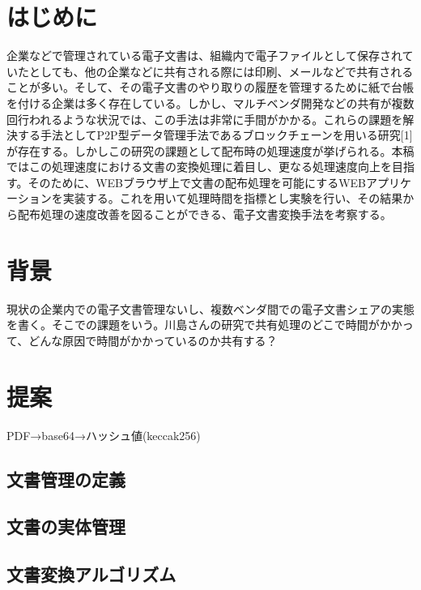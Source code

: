 \documentclass[10.5pt,a4paper,twocolumn]{jsarticle}
\title{\textbf{\title}}
\author{{指導教員}\hspace{1.2em}{\gt \teachername} \\ 
{\sf \studentid}\hspace{1.5em}{\gt \studentname}}
\date{}
\begin{document}
\pagestyle{empty}

\maketitle

\section{はじめに}
企業などで管理されている電子文書は、組織内で電子ファイルとして保存されていたとしても、他の企業などに共有される際には印刷、メールなどで共有されることが多い。そして、その電子文書のやり取りの履歴を管理するために紙で台帳を付ける企業は多く存在している。しかし、マルチベンダ開発などの共有が複数回行われるような状況では、この手法は非常に手間がかかる。これらの課題を解決する手法としてP2P型データ管理手法であるブロックチェーンを用いる研究[1]が存在する。しかしこの研究の課題として配布時の処理速度が挙げられる。本稿ではこの処理速度における文書の変換処理に着目し、更なる処理速度向上を目指す。そのために、WEBブラウザ上で文書の配布処理を可能にするWEBアプリケーションを実装する。これを用いて処理時間を指標とし実験を行い、その結果から配布処理の速度改善を図ることができる、電子文書変換手法を考察する。

\section{背景}
現状の企業内での電子文書管理ないし、複数ベンダ間での電子文書シェアの実態を書く。そこでの課題をいう。川島さんの研究で共有処理のどこで時間がかかって、どんな原因で時間がかかっているのか共有する？

\section{提案}
PDF→base64→ハッシュ値(keccak256)
\subsection{文書管理の定義}
\subsection{文書の実体管理}
\subsection{文書変換アルゴリズム}
\end{document}
